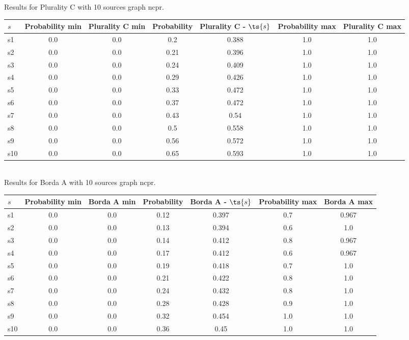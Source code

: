 \documentclass{article}
\begin{document}
\noindent Results for Plurality C with 10 sources graph ncpr.

\noindent\begin{tabular}{|l|c|c|c|c|c|c|}
\hline
$s$& Probability min & Plurality C min & Probability & Plurality C - $\ts{s}$ & Probability max & Plurality C max\\
\hline
s1 &0.0 & 0.0 & 0.2 & 0.388 & 1.0 & 1.0\\
\hline
s2 &0.0 & 0.0 & 0.21 & 0.396 & 1.0 & 1.0\\
\hline
s3 &0.0 & 0.0 & 0.24 & 0.409 & 1.0 & 1.0\\
\hline
s4 &0.0 & 0.0 & 0.29 & 0.426 & 1.0 & 1.0\\
\hline
s5 &0.0 & 0.0 & 0.33 & 0.472 & 1.0 & 1.0\\
\hline
s6 &0.0 & 0.0 & 0.37 & 0.472 & 1.0 & 1.0\\
\hline
s7 &0.0 & 0.0 & 0.43 & 0.54 & 1.0 & 1.0\\
\hline
s8 &0.0 & 0.0 & 0.5 & 0.558 & 1.0 & 1.0\\
\hline
s9 &0.0 & 0.0 & 0.56 & 0.572 & 1.0 & 1.0\\
\hline
s10 &0.0 & 0.0 & 0.65 & 0.593 & 1.0 & 1.0\\
\hline
\end{tabular}\\

\noindent Results for Borda A with 10 sources graph ncpr.

\noindent\begin{tabular}{|l|c|c|c|c|c|c|}
\hline
$s$& Probability min & Borda A min & Probability & Borda A - $\ts{s}$ & Probability max & Borda A max\\
\hline
s1 &0.0 & 0.0 & 0.12 & 0.397 & 0.7 & 0.967\\
\hline
s2 &0.0 & 0.0 & 0.13 & 0.394 & 0.6 & 1.0\\
\hline
s3 &0.0 & 0.0 & 0.14 & 0.412 & 0.8 & 0.967\\
\hline
s4 &0.0 & 0.0 & 0.17 & 0.412 & 0.6 & 0.967\\
\hline
s5 &0.0 & 0.0 & 0.19 & 0.418 & 0.7 & 1.0\\
\hline
s6 &0.0 & 0.0 & 0.21 & 0.422 & 0.8 & 1.0\\
\hline
s7 &0.0 & 0.0 & 0.24 & 0.432 & 0.8 & 1.0\\
\hline
s8 &0.0 & 0.0 & 0.28 & 0.428 & 0.9 & 1.0\\
\hline
s9 &0.0 & 0.0 & 0.32 & 0.454 & 1.0 & 1.0\\
\hline
s10 &0.0 & 0.0 & 0.36 & 0.45 & 1.0 & 1.0\\
\hline
\end{tabular}\\
\end{document}
